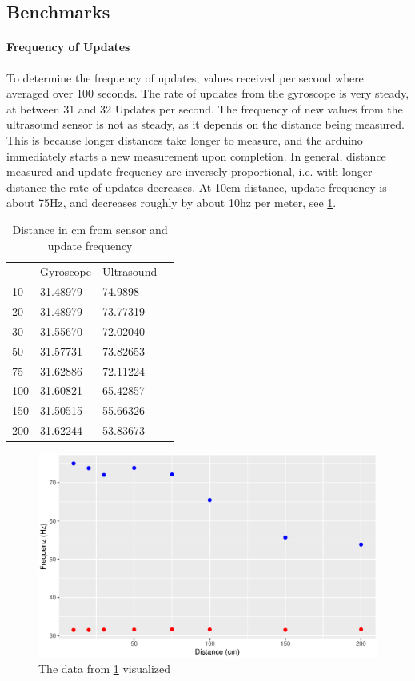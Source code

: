 \subsection{Benchmarks}
\label{subsec:benchmark}

\paragraph{Frequency of Updates}
To determine the frequency of updates, values received per second where averaged over 100 seconds.
The rate of updates from the gyroscope is very steady, at between 31 and 32 Updates per second.
The frequency of new values from the ultrasound sensor is not as steady, as it depends on the distance being measured.
This is because longer distances take longer to measure, and the arduino immediately starts a new measurement upon completion.
In general, distance measured and update frequency are inversely proportional, i.e. with longer distance the rate of updates decreases.
At 10cm distance, update frequency is about 75Hz, and decreases roughly by about 10hz per meter, see \ref{fig:benchmark}.

\begin{table}
    \centering
    \begin{tabular}{l|lll}
            & Gyroscope & Ultrasound & \\
        \cline{1-3}
        10  & 31.48979  & 74.9898    & \\
        20  & 31.48979  & 73.77319   & \\
        30  & 31.55670  & 72.02040   & \\
        50  & 31.57731  & 73.82653   & \\
        75  & 31.62886  & 72.11224   & \\
        100 & 31.60821  & 65.42857   & \\
        150 & 31.50515  & 55.66326   & \\
        200 & 31.62244  & 53.83673   &
    \end{tabular}

    \caption{Distance in cm from sensor and update frequency}
    \label{table:benchmark}
\end{table}

\begin{figure}
    \centering
    \includegraphics[width=0.5\linewidth]{figures/benchmark.eps}
    \caption{The data from \ref{table:benchmark} visualized}
    \label{fig:benchmark}
\end{figure}

